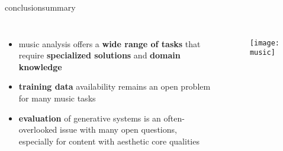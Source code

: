\begin{frame}{conclusion}{summary}
		\begin{columns}
						\begin{itemize}
								\item music analysis offers a \textbf{wide range of tasks} that require \textbf{specialized solutions} and \textbf{domain knowledge}
								
								\bigskip
								\item \textbf{training data} availability remains an open problem for many music tasks
								
								\bigskip
								\item \textbf{evaluation} of generative systems is an often-overlooked issue with many open questions, especially for content with aesthetic core qualities
						\end{itemize}
						\begin{figure}
								\texttt{[image: music]}
						\end{figure}
		\end{columns}
\end{frame}

